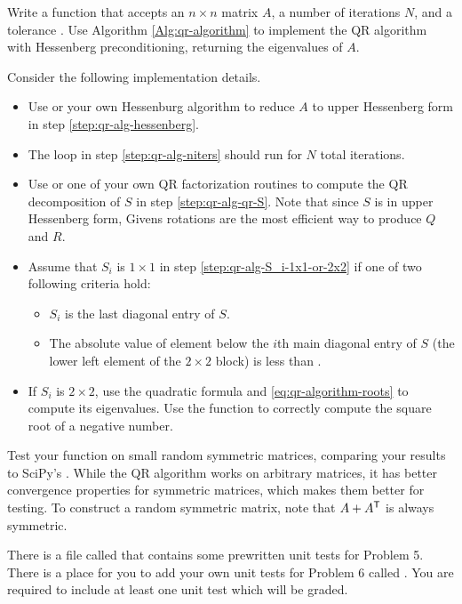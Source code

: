 \begin{problem}
Write a function that accepts an $n \times n$ matrix $A$, a number of iterations $N$, and a tolerance .
Use Algorithm \ref{Alg:qr-algorithm} to implement the QR algorithm with Hessenberg preconditioning, returning the eigenvalues of $A$.

Consider the following implementation details.
\begin{itemize}
    \item Use  or your own Hessenburg algorithm to reduce $A$ to upper Hessenberg form in step \ref{step:qr-alg-hessenberg}.
    \item The loop in step \ref{step:qr-alg-niters} should run for $N$ total iterations.
    \item Use  or one of your own QR factorization routines to compute the QR decomposition of $S$ in step \ref{step:qr-alg-qr-S}.
    Note that since $S$ is in upper Hessenberg form, Givens rotations are the most efficient way to produce $Q$ and $R$.
    \item Assume that $S_i$ is $1 \times 1$ in step \ref{step:qr-alg-S_i-1x1-or-2x2} if one of two following criteria hold:
    \begin{itemize}
        \item $S_i$ is the last diagonal entry of $S$.
        \item The absolute value of element below the $i$th main diagonal entry of $S$ (the lower left element of the $2\times 2$ block) is less than .
    \end{itemize}
    \item If $S_i$ is $2 \times 2$, use the quadratic formula and \eqref{eq:qr-algorithm-roots} to compute its eigenvalues.
    Use the function  to correctly compute the square root of a negative number.
\end{itemize}

Test your function on small random symmetric matrices, comparing your results to SciPy's .
While the QR algorithm works on arbitrary matrices, it has better convergence properties for symmetric matrices, which makes them better for testing.
To construct a random symmetric matrix, note that $A + A^{\mathsf T}$ is always symmetric.
\end{problem}

\begin{unittest}
There is a file called  that contains some prewritten unit tests for Problem 5. There is a place for you to add your own unit tests for Problem 6 called . You are required to include at least one unit test which will be graded.
\end{unittest}

